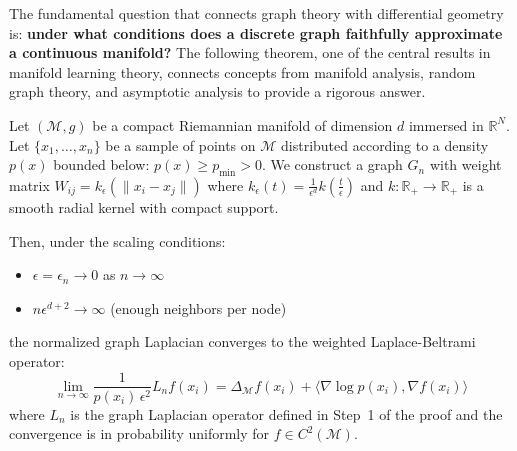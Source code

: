 The fundamental question that connects graph theory with differential geometry is: \textbf{under what conditions does a discrete graph faithfully approximate a continuous manifold?} The following theorem, one of the central results in manifold learning theory, connects concepts from manifold analysis, random graph theory, and asymptotic analysis to provide a rigorous answer.

\begin{theorem}\label{thm:convergencia_grafos_variedades_detallado}
	Let $(\mathcal{M}, g)$ be a compact Riemannian manifold of dimension $d$ immersed in $\mathbb{R}^N$. Let $\{x_1, \ldots, x_n\}$ be a sample of points on $\mathcal{M}$ distributed according to a density $p(x)$ bounded below: $p(x) \geq p_{\min} > 0$. We construct a graph $G_n$ with weight matrix $W_{ij} = k_\epsilon(\|x_i - x_j\|)$ where $k_\epsilon(t) = \frac{1}{\epsilon^d} k\left(\frac{t}{\epsilon}\right)$ and $k: \mathbb{R}_+ \to \mathbb{R}_+$ is a smooth radial kernel with compact support.

	Then, under the scaling conditions:
	\begin{itemize}
		\item $\epsilon = \epsilon_n \to 0$ as $n \to \infty$
		\item $n\epsilon^{d+2} \to \infty$ (enough neighbors per node)
	\end{itemize}

	the normalized graph Laplacian converges to the weighted Laplace-Beltrami operator:
	\[
		\lim_{n \to \infty} \frac{1}{p(x_i)\,\epsilon^2} L_n f(x_i) = \Delta_\mathcal{M} f(x_i) + \langle \nabla \log p(x_i), \nabla f(x_i) \rangle
	\]
	where $L_n$ is the graph Laplacian operator defined in Step~1 of the proof and the convergence is in probability uniformly for $f \in C^2(\mathcal{M})$.
\end{theorem}


